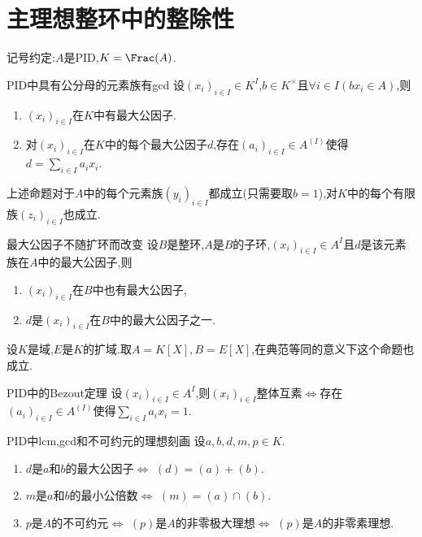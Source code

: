 \section{主理想整环中的整除性}

记号约定:$A$是PID,$K=\Frac(A)$.

\begin{proposition}{PID中具有公分母的元素族有gcd}{}
	设$\left(x_{i}\right)_{i\in I}\in K^{I}$,$b\in K^{\times}$且$\forall i\in I\left(bx_{i}\in A\right)$,则
	\begin{enumerate}
		\item $\left(x_{i}\right)_{i\in I}$在$K$中有最大公因子.
		\item 对$\left(x_{i}\right)_{i\in I}$在$K$中的每个最大公因子$d$,存在$\left(a_{i}\right)_{i\in I}\in A^{\left(I\right)}$使得$d=\sum\limits_{i\in I}a_{i}x_{i}$.
	\end{enumerate}
\end{proposition}

\begin{remark}{}{}
	上述命题对于$A$中的每个元素族$\left(y_{i}\right)_{i\in I}$都成立(只需要取$b=1$),对$K$中的每个有限族$\left(z_{i}\right)_{i\in I}$也成立.
\end{remark}

\begin{proposition}{最大公因子不随扩环而改变}{}
	设$B$是整环,$A$是$B$的子环,$\left(x_{i}\right)_{i\in I}\in A^{I}$且$d$是该元素族在$A$中的最大公因子,则
	\begin{enumerate}
		\item $\left(x_{i}\right)_{i\in I}$在$B$中也有最大公因子,
		\item $d$是$\left(x_{i}\right)_{i\in I}$在$B$中的最大公因子之一.
	\end{enumerate}
\end{proposition}

\begin{remark}{}{}
	设$K$是域,$E$是$K$的扩域.取$A=K[X],B=E[X]$,在典范等同的意义下这个命题也成立.
\end{remark}

\begin{theorem}{PID中的Bezout定理}{}
	设$\left(x_{i}\right)_{i\in I}\in A^{I}$,则$\left(x_{i}\right)_{i\in I}$整体互素$\iff$存在$\left(a_{i}\right)_{i\in I}\in A^{\left(I\right)}$使得$\sum\limits_{i\in I}a_{i}x_{i}=1$.
\end{theorem}

\begin{proposition}{PID中lcm,gcd和不可约元的理想刻画}{}
	设$a,b,d,m,p\in K$.
	\begin{enumerate}
		\item $d$是$a$和$b$的最大公因子$\iff$ $\left(d\right)=\left(a\right)+\left(b\right)$.
		\item $m$是$a$和$b$的最小公倍数$\iff$ $\left(m\right)=\left(a\right)\cap\left(b\right)$.
		\item $p$是$A$的不可约元$\iff$ $\left(p\right)$是$A$的非零极大理想$\iff$ $\left(p\right)$是$A$的非零素理想.
	\end{enumerate}
\end{proposition}

